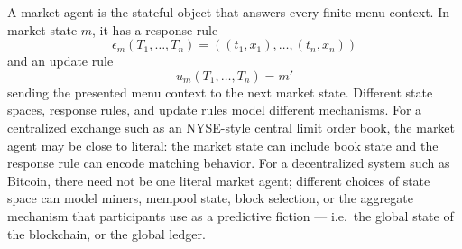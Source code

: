 \documentclass[11pt, one side, article]{memoir}
\theoremstyle{definition}
\theoremstyle{plain}
\newcommand{\0}{\textsf{0}}
\newcommand{\1}{\tn{\textsf{1}}}
\begin{document}
A market-agent is the stateful object that answers every finite menu context.  In market state $m$, it has a response rule
\[
\epsilon_m(T_1,\ldots,T_n)=((t_1,x_1),\ldots,(t_n,x_n))
\]
and an update rule
\[
u_m(T_1,\ldots,T_n)=m'
\]
sending the presented menu context to the next market state.  Different state spaces, response rules, and update rules model different mechanisms.  For a centralized exchange such as an NYSE-style central limit order book, the market agent may be close to literal: the market state can include book state and the response rule can encode matching behavior.  For a decentralized system such as Bitcoin, there need not be one literal market agent; different choices of state space can model miners, mempool state, block selection, or the aggregate mechanism that participants use as a predictive fiction --- i.e.\ the global state of the blockchain, or the global ledger.
\end{document}
